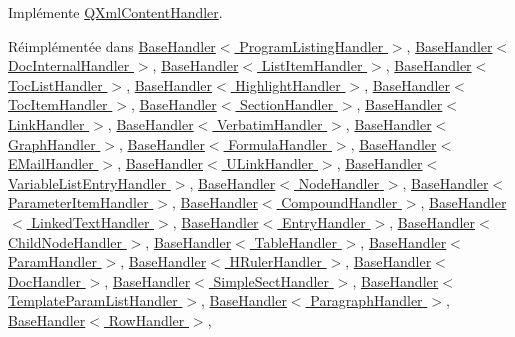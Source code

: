 Implémente \hyperlink{class_q_xml_content_handler_ac3b27d569634c5d7a7fac001a6cc4845}{Q\+Xml\+Content\+Handler}.



Réimplémentée dans \hyperlink{class_base_handler_a2191a9b5ac9ebddc8c91dd56fff8e684}{Base\+Handler$<$ Program\+Listing\+Handler $>$}, \hyperlink{class_base_handler_a2191a9b5ac9ebddc8c91dd56fff8e684}{Base\+Handler$<$ Doc\+Internal\+Handler $>$}, \hyperlink{class_base_handler_a2191a9b5ac9ebddc8c91dd56fff8e684}{Base\+Handler$<$ List\+Item\+Handler $>$}, \hyperlink{class_base_handler_a2191a9b5ac9ebddc8c91dd56fff8e684}{Base\+Handler$<$ Toc\+List\+Handler $>$}, \hyperlink{class_base_handler_a2191a9b5ac9ebddc8c91dd56fff8e684}{Base\+Handler$<$ Highlight\+Handler $>$}, \hyperlink{class_base_handler_a2191a9b5ac9ebddc8c91dd56fff8e684}{Base\+Handler$<$ Toc\+Item\+Handler $>$}, \hyperlink{class_base_handler_a2191a9b5ac9ebddc8c91dd56fff8e684}{Base\+Handler$<$ Section\+Handler $>$}, \hyperlink{class_base_handler_a2191a9b5ac9ebddc8c91dd56fff8e684}{Base\+Handler$<$ Link\+Handler $>$}, \hyperlink{class_base_handler_a2191a9b5ac9ebddc8c91dd56fff8e684}{Base\+Handler$<$ Verbatim\+Handler $>$}, \hyperlink{class_base_handler_a2191a9b5ac9ebddc8c91dd56fff8e684}{Base\+Handler$<$ Graph\+Handler $>$}, \hyperlink{class_base_handler_a2191a9b5ac9ebddc8c91dd56fff8e684}{Base\+Handler$<$ Formula\+Handler $>$}, \hyperlink{class_base_handler_a2191a9b5ac9ebddc8c91dd56fff8e684}{Base\+Handler$<$ E\+Mail\+Handler $>$}, \hyperlink{class_base_handler_a2191a9b5ac9ebddc8c91dd56fff8e684}{Base\+Handler$<$ U\+Link\+Handler $>$}, \hyperlink{class_base_handler_a2191a9b5ac9ebddc8c91dd56fff8e684}{Base\+Handler$<$ Variable\+List\+Entry\+Handler $>$}, \hyperlink{class_base_handler_a2191a9b5ac9ebddc8c91dd56fff8e684}{Base\+Handler$<$ Node\+Handler $>$}, \hyperlink{class_base_handler_a2191a9b5ac9ebddc8c91dd56fff8e684}{Base\+Handler$<$ Parameter\+Item\+Handler $>$}, \hyperlink{class_base_handler_a2191a9b5ac9ebddc8c91dd56fff8e684}{Base\+Handler$<$ Compound\+Handler $>$}, \hyperlink{class_base_handler_a2191a9b5ac9ebddc8c91dd56fff8e684}{Base\+Handler$<$ Linked\+Text\+Handler $>$}, \hyperlink{class_base_handler_a2191a9b5ac9ebddc8c91dd56fff8e684}{Base\+Handler$<$ Entry\+Handler $>$}, \hyperlink{class_base_handler_a2191a9b5ac9ebddc8c91dd56fff8e684}{Base\+Handler$<$ Child\+Node\+Handler $>$}, \hyperlink{class_base_handler_a2191a9b5ac9ebddc8c91dd56fff8e684}{Base\+Handler$<$ Table\+Handler $>$}, \hyperlink{class_base_handler_a2191a9b5ac9ebddc8c91dd56fff8e684}{Base\+Handler$<$ Param\+Handler $>$}, \hyperlink{class_base_handler_a2191a9b5ac9ebddc8c91dd56fff8e684}{Base\+Handler$<$ H\+Ruler\+Handler $>$}, \hyperlink{class_base_handler_a2191a9b5ac9ebddc8c91dd56fff8e684}{Base\+Handler$<$ Doc\+Handler $>$}, \hyperlink{class_base_handler_a2191a9b5ac9ebddc8c91dd56fff8e684}{Base\+Handler$<$ Simple\+Sect\+Handler $>$}, \hyperlink{class_base_handler_a2191a9b5ac9ebddc8c91dd56fff8e684}{Base\+Handler$<$ Template\+Param\+List\+Handler $>$}, \hyperlink{class_base_handler_a2191a9b5ac9ebddc8c91dd56fff8e684}{Base\+Handler$<$ Paragraph\+Handler $>$}, \hyperlink{class_base_handler_a2191a9b5ac9ebddc8c91dd56fff8e684}{Base\+Handler$<$ Row\+Handler $>$}, 
